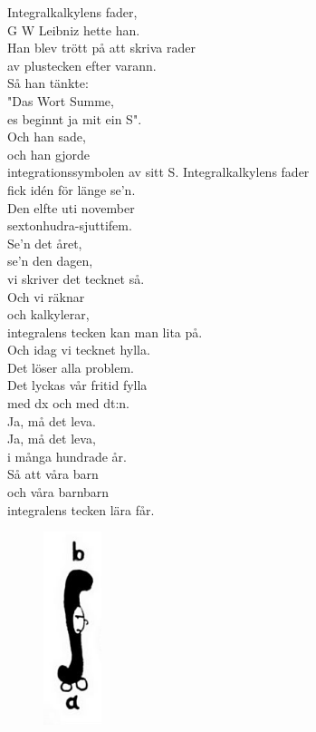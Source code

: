 \documentclass[a6paper, 10pt, twoside]{article}
\begin{document}
\begin{lyrics}
Integralkalkylens fader, \\
G W Leibniz hette han. \\
Han blev trött på att skriva rader \\
av plustecken efter varann. 
\vspace{5pt}\\
Så han tänkte: \\
"Das Wort Summe, \\
es beginnt ja mit ein S". \\
Och han sade, \\
och han gjorde \\
integrationssymbolen av sitt S. 
\newpage
\noindent
Integralkalkylens fader \\
fick idén för länge se'n. \\
Den elfte uti november \\
sextonhudra-sjuttifem. \\
Se'n det året, \\
se'n den dagen, \\
vi skriver det tecknet så. \\
Och vi räknar \\
och kalkylerar, \\
integralens tecken kan man lita på. 
\vspace{5pt} \\
Och idag vi tecknet hylla. \\
Det löser alla problem. \\
Det lyckas vår fritid fylla \\
med dx och med dt:n. \\
Ja, må det leva. \\
Ja, må det leva, \\
i många hundrade år. \\
Så att våra barn \\
och våra barnbarn \\
integralens tecken lära får. 
\end{lyrics}
\vspace{-10pt}
\begin{figure}[!h]
\hspace{30pt}\includegraphics[width=0.15\textwidth]{integral.jpg}
\end{figure}
\end{document}
